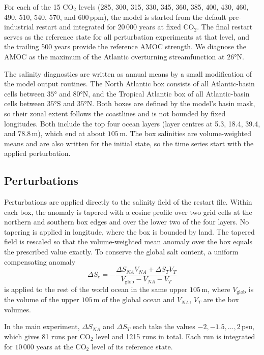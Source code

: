 \documentclass[12pt, a4paper]{article}
\newcommand{\psu}{\,\text{psu}}
\newcommand{\CO}{CO\ensuremath{_2}}
\begin{document}
For each of the 15 \CO{} levels (285, 300, 315, 330, 345, 360, 385, 400, 430, 460, 490, 510, 540, 570, and $600\,\text{ppm}$), the model is started from the default pre-industrial restart and integrated for $20\,000$ years at fixed \CO{}. The final restart serves as the reference state for all perturbation experiments at that level, and the trailing 500 years provide the reference AMOC strength. We diagnose the AMOC as the maximum of the Atlantic overturning streamfunction at $26°\text{N}$.

The salinity diagnostics are written as annual means by a small modification of the model output routines. The North Atlantic box consists of all Atlantic-basin cells between $35°$ and $80°\text{N}$, and the Tropical Atlantic box of all Atlantic-basin cells between $35°\text{S}$ and $35°\text{N}$. Both boxes are defined by the model's basin mask, so their zonal extent follows the coastlines and is not bounded by fixed longitudes. Both include the top four ocean layers (layer centres at 5.3, 18.4, 39.4, and $78.8\,\text{m}$), which end at about $105\,\text{m}$. The box salinities are volume-weighted means and are also written for the initial state, so the time series start with the applied perturbation.

\subsection*{Perturbations}

Perturbations are applied directly to the salinity field of the restart file. Within each box, the anomaly is tapered with a cosine profile over two grid cells at the northern and southern box edges and over the lower two of the four layers. No tapering is applied in longitude, where the box is bounded by land. The tapered field is rescaled so that the volume-weighted mean anomaly over the box equals the prescribed value exactly. To conserve the global salt content, a uniform compensating anomaly
\begin{equation}
\Delta S_c=-\frac{\Delta S_{NA}V_{NA}+\Delta S_{T}V_{T}}{V_{\mathrm{glob}}-V_{NA}-V_{T}}
\end{equation}
is applied to the rest of the world ocean in the same upper $105\,\text{m}$, where $V_{\mathrm{glob}}$ is the volume of the upper $105\,\text{m}$ of the global ocean and $V_{NA}$, $V_T$ are the box volumes.

In the main experiment, $\Delta S_{NA}$ and $\Delta S_T$ each take the values $-2,-1.5,\ldots,2\psu{}$, which gives 81 runs per \CO{} level and 1215 runs in total. Each run is integrated for $10\,000$ years at the \CO{} level of its reference state.
\end{document}
